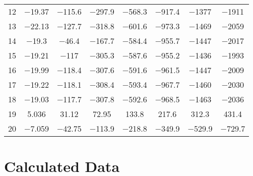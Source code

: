 \begin{table}[htpb]
\begin{tabular}{lccccccc}
		\num{12} & \num{-19.37} & \num{-115.6} & \num{-297.9} & \num{-568.3} & \num{-917.4} & \num{-1377} & \num{-1911} \\
		\num{13} & \num{-22.13} & \num{-127.7} & \num{-318.8} & \num{-601.6} & \num{-973.3} & \num{-1469} & \num{-2059} \\
		\num{14} & \num{-19.3} & \num{-46.4} & \num{-167.7} & \num{-584.4} & \num{-955.7} & \num{-1447} & \num{-2017} \\
		\num{15} & \num{-19.21} & \num{-117} & \num{-305.3} & \num{-587.6} & \num{-955.2} & \num{-1436} & \num{-1993} \\
		\num{16} & \num{-19.99} & \num{-118.4} & \num{-307.6} & \num{-591.6} & \num{-961.5} & \num{-1447} & \num{-2009} \\
		\num{17} & \num{-19.22} & \num{-118.1} & \num{-308.4} & \num{-593.4} & \num{-967.7} & \num{-1460} & \num{-2030} \\
		\num{18} & \num{-19.03} & \num{-117.7} & \num{-307.8} & \num{-592.6} & \num{-968.5} & \num{-1463} & \num{-2036} \\
		\num{19} & \num{5.036} & \num{31.12} & \num{72.95} & \num{133.8} & \num{217.6} & \num{312.3} & \num{431.4} \\
		\num{20} & \num{-7.059} & \num{-42.75} & \num{-113.9} & \num{-218.8} & \num{-349.9} & \num{-529.9} & \num{-729.7} \\
        \bottomrule
    \end{tabular}
\end{table}

\section{Calculated Data}


